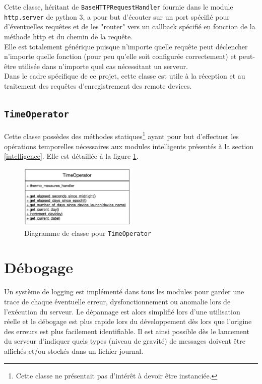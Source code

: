 \documentclass[11pt,a4paper,11pt]{report}
\begin{document}
Cette classe, héritant de \texttt{BaseHTTPRequestHandler} fournie dans le module \texttt{http.server} de python 3, a pour but d'écouter sur un port spécifié pour d'éventuelles requêtes et de les "router" vers un callback spécifié en fonction de la méthode http et du chemin de la requête.\\

Elle est totalement générique puisque n'importe quelle requête peut déclencher n'importe quelle fonction (pour peu qu'elle soit configurée correctement) et peut-être utilisée dans n'importe quel cas nécessitant un serveur.\\

Dans le cadre spécifique de ce projet, cette classe est utile à la réception et au traitement des requêtes d'enregistrement des remote devices.

\subsection{\texttt{TimeOperator}}

Cette classe possèdes des méthodes statiques\footnote{Cette classe ne présentait pas d'intérêt à devoir être instanciée.} ayant pour but d'effectuer les opérations temporelles nécessaires aux modules intelligents présentés à la section \ref{intelligence}. Elle est détaillée à la figure \ref{timeoperator}.

\begin{figure}[h]
\centering
\includegraphics[width=0.5\textwidth]{images/TimeOperator_class_diagram.png}
\caption{Diagramme de classe pour \texttt{TimeOperator}}
\label{timeoperator}
\end{figure}

\section{Débogage}

Un système de logging est implémenté dans tous les modules pour garder une trace de chaque éventuelle erreur, dysfonctionnement ou anomalie lors de l'exécution du serveur. Le dépannage est alors simplifié lors d'une utilisation réelle et le débogage est plus rapide lors du développement dès lors que l'origine des erreurs est plus facilement identifiable. Il est ainsi possible dès le lancement du serveur d'indiquer quels types (niveau de gravité) de messages doivent être affichés et/ou stockés dans un fichier journal.
\end{document}
